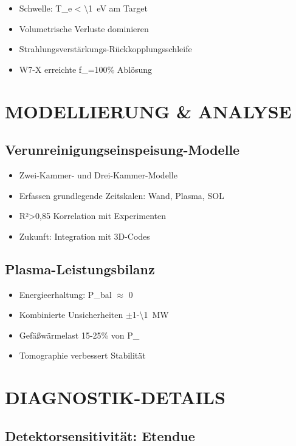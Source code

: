 \documentclass[11pt,a4paper]{article}
\begin{document}
\begin{itemize}
\item Schwelle: T_e < \SI{\1}{eV} am Target
\item Volumetrische Verluste dominieren
\item Strahlungsverstärkungs-Rückkopplungsschleife
\item W7-X erreichte f_{}=100\% Ablösung
\end{itemize}

\section{MODELLIERUNG & ANALYSE}

\subsection{Verunreinigungseinspeisung-Modelle}

\begin{itemize}
\item Zwei-Kammer- und Drei-Kammer-Modelle
\item Erfassen grundlegende Zeitskalen: Wand, Plasma, SOL
\item R²>0,85 Korrelation mit Experimenten
\item Zukunft: Integration mit 3D-Codes
\end{itemize}

\subsection{Plasma-Leistungsbilanz}

\begin{itemize}
\item Energieerhaltung: P_bal $\approx$ 0
\item Kombinierte Unsicherheiten $\pm$1-\SI{\1}{MW}
\item Gefäßwärmelast 15-25\% von P_{}
\item Tomographie verbessert Stabilität
\end{itemize}

\section{DIAGNOSTIK-DETAILS}

\subsection{Detektorsensitivität: Etendue}
\end{document}
